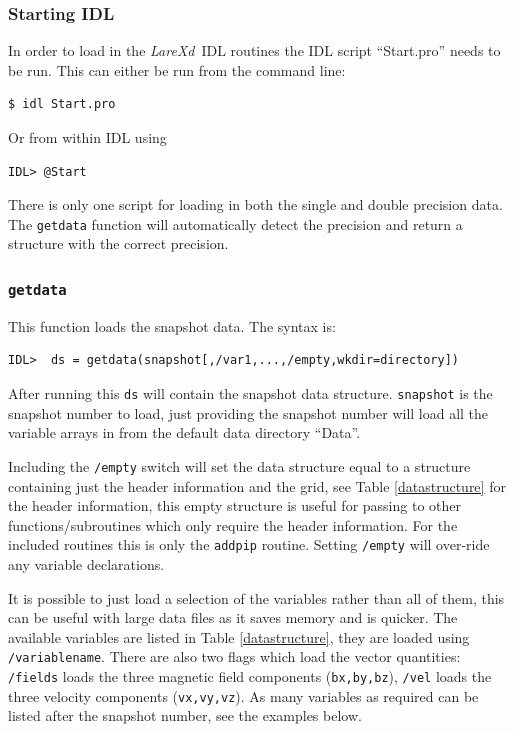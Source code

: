 \documentclass[11pt]{article}
\newcommand{\lare}{{\it LareXd}\ }
\begin{document}
\subsubsection{Starting IDL}
In order to load in the \lare IDL routines the IDL script ``Start.pro'' needs to be run. This can either be run from the command line:
\begin{verbatim}
$ idl Start.pro
\end{verbatim}
Or from within IDL using
\begin{verbatim}
IDL> @Start
\end{verbatim}

There is only one script for loading in both the single and double precision data. The \texttt{getdata} function will automatically detect the precision and return a structure with the correct precision.

\subsubsection{\texttt{getdata}}
This function loads the snapshot data. The syntax is:
\begin{verbatim}
IDL>  ds = getdata(snapshot[,/var1,...,/empty,wkdir=directory])
\end{verbatim}

After running this \texttt{ds} will contain the snapshot data structure. \texttt{snapshot} is the snapshot number to load, just providing the snapshot number will load all the variable arrays in from the default data directory ``Data''.

Including the \texttt{/empty} switch will set the data structure equal to a structure containing just the header information and the grid, see Table \ref{datastructure} for the header information, this empty structure is useful for passing to other functions/subroutines which only require the header information. For the included routines this is only the \texttt{addpip} routine. Setting \texttt{/empty} will over-ride any variable declarations.

It is possible to just load a selection of the variables rather than all of them, this can be useful with large data files as it saves memory and is quicker. The available variables are listed in Table \ref{datastructure}, they are loaded using \texttt{/variablename}. There are also two flags which load the vector quantities: \texttt{/fields} loads the three magnetic field components (\texttt{bx,by,bz}), \texttt{/vel} loads the three velocity components (\texttt{vx,vy,vz}). As many variables as required can be listed after the snapshot number, see the examples below.
\end{document}

